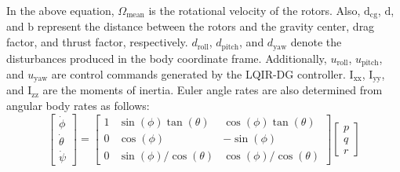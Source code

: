\documentclass[3p]{elsarticle}
\begin{document}
In the above equation, $\Omega_{\text{mean}}$ is the rotational velocity of the rotors. Also, $\mathrm{d}_{\text{cg}}$, $\text{d}$, and $\text{b}$ represent the distance between the rotors and the gravity center, drag factor, and thrust factor, respectively.
$d_{\text{roll}}$, $d_{\text{pitch}}$, and $d_{\text{yaw}}$ denote the disturbances produced in the body coordinate frame. Additionally,
$u_{\text{roll}}$, $u_{\text{pitch}}$, and $u_{\text{yaw}}$ are control commands generated by the LQIR-DG controller.
 $\mathrm{I}_{\text{xx}}$, $\mathrm{I}_{\text{yy}}$, and $\mathrm{I}_{\text{zz}}$ are the moments of inertia.
Euler angle rates are also determined from angular body rates as follows:
\begin{equation}
    \begin{bmatrix}
    \dot\phi \\
    \dot\theta \\
    \dot\psi
    \end{bmatrix} = 
    \begin{bmatrix}
    1 & \sin(\phi)\tan(\theta) & \cos(\phi)\tan(\theta) \\
    0 & \cos(\phi) & -\sin(\phi) \\
    0 & \sin(\phi)/\cos(\theta) & \cos(\phi)/\cos(\theta)
    \end{bmatrix}
    \begin{bmatrix}
    p \\
    q \\
    r
    \end{bmatrix}
\end{equation}
\end{document}
